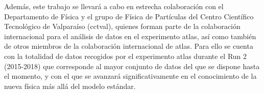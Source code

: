 Además, este trabajo se llevará a cabo en estrecha colaboración con el Departamento de Física y el grupo de Física de Partículas del Centro Científico Tecnológico de Valparaíso (\acrshort{cctval}), quienes forman parte de la colaboración internacional para el análisis de datos en el experimento \acrshort{atlas}, así como también de otros miembros de la colaboración internacional de \acrshort{atlas}. 
%
Para ello se cuenta con la totalidad de datos recogidos por el experimento \acrshort{atlas} durante el Run 2 (2015-2018) que corresponde al mayor conjunto de datos del que se dispone hasta el momento, y con el que se avanzará significativamente en el conocimiento de la nueva física más allá del modelo estándar.

